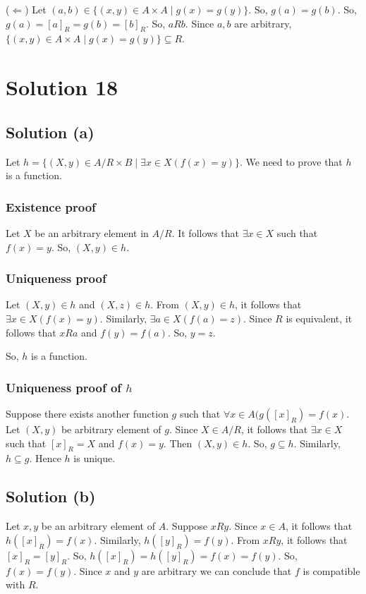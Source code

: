 \documentclass{article}
\begin{document}
($\Leftarrow$) Let $(a,b) \in \{(x,y) \in A \times A \mid g(x) =
g(y)\}$. So, $g(a) = g(b)$. So, $g(a) = [a]_R = g(b) = [b]_R$. So,
$aRb$. Since $a,b$ are arbitrary, $\{(x,y) \in A \times A \mid g(x) =
g(y)\} \subseteq R$.

\section{Solution 18}
\subsection{Solution (a)}
Let $h = \{(X,y) \in A/R \times B \mid \exists x \in X(f(x) = y)\}$.
We need to prove that $h$ is a function.
\subsubsection{Existence proof}
Let $X$ be an arbitrary element in $A/R$. It follows that $\exists x
\in X$ such that $f(x) = y$. So, $(X,y) \in h$.

\subsubsection{Uniqueness proof}
Let $(X,y) \in h$ and $(X,z) \in h$. From $(X,y) \in h$, it follows
that $\exists x \in X(f(x) = y)$. Similarly, $\exists a \in X(f(a) =
z)$. Since $R$ is equivalent, it follows that $xRa$ and $f(y) = f(a)$.
So, $y = z$.

So, $h$ is a function.

\subsubsection{Uniqueness proof of $h$}
Suppose there exists another function $g$ such that $\forall x \in
A(g([x]_R) = f(x)$. Let $(X,y)$ be arbitrary element of $g$. Since $X
\in A/R$, it follows that $\exists x \in X$ such that $[x]_R = X$ and
$f(x) = y$. Then $(X,y) \in h$. So, $g \subseteq h$. Similarly, 
$h \subseteq g$. Hence $h$ is unique.

\subsection{Solution (b)}
Let $x,y$ be an arbitrary element of $A$. Suppose $xRy$. Since $x \in
A$, it follows that $h([x]_R) = f(x)$. Similarly, $h([y]_R) = f(y)$.
From $xRy$, it follows that $[x]_R = [y]_R$. So, $h([x]_R) = h([y]_R)
= f(x) = f(y)$. So, $f(x) = f(y)$. Since $x$ and $y$ are arbitrary we
can conclude that $f$ is compatible with $R$.
\end{document}

